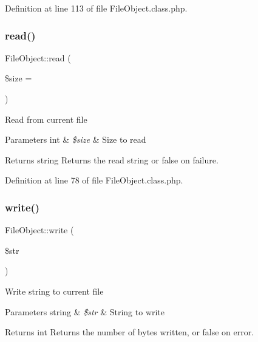 Definition at line 113 of file File\+Object.\+class.\+php.

\hypertarget{classFileObject_af345fcd2d619a3e13b1f95f744964617}{}\label{classFileObject_af345fcd2d619a3e13b1f95f744964617} 
\subsubsection{\texorpdfstring{read()}{read()}}
{\footnotesize\ttfamily File\+Object\+::read (\begin{DoxyParamCaption}\item[{}]{\$size = {} }\end{DoxyParamCaption})}

Read from current file


\begin{DoxyParams}[1]{Parameters}
int & {\em \$size} & Size to read \\
\hline
\end{DoxyParams}
\begin{DoxyReturn}{Returns}
string Returns the read string or false on failure. 
\end{DoxyReturn}


Definition at line 78 of file File\+Object.\+class.\+php.

\hypertarget{classFileObject_a6bfe97d0df5b57183c0816fb013b7fb2}{}\label{classFileObject_a6bfe97d0df5b57183c0816fb013b7fb2} 
\subsubsection{\texorpdfstring{write()}{write()}}
{\footnotesize\ttfamily File\+Object\+::write (\begin{DoxyParamCaption}\item[{}]{\$str }\end{DoxyParamCaption})}

Write string to current file


\begin{DoxyParams}[1]{Parameters}
string & {\em \$str} & String to write \\
\hline
\end{DoxyParams}
\begin{DoxyReturn}{Returns}
int Returns the number of bytes written, or false on error. 
\end{DoxyReturn}


